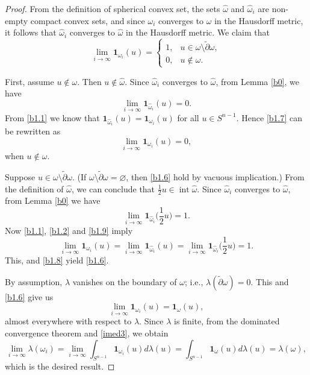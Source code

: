 \documentclass{cpamart1}     %
\theoremstyle{definition}
\theoremstyle{remark}
\newcommand{\chara}[1]{{\mathbf{1}_{#1}}}
\DeclareMathOperator{\Int}{int}
\begin{document}
\begin{proof}
From the definition of spherical convex set, the sets $\hat{\omega}$
and $\hat{\omega}_i$ are non-empty compact convex sets, and since $\omega_i$
converges to $\omega$ in the Hausdorff metric, it follows that $\hat{\omega}_i$
converges to $\hat{\omega}$ in the Hausdorff metric.
We claim that
\begin{equation}
\label{b1.6}
\lim_{i\rightarrow \infty} \chara{\omega_i}(u)=
\begin{cases}
1,& u\in \omega\setminus\tilde{\partial}\omega,\\
0,& u\notin \omega.
\end{cases}
\end{equation}

First, assume $u\notin \omega$. Then $u\notin \hat{\omega}$.
Since $\hat{\omega}_i$ converges to $\hat{\omega}$, from Lemma \ref{b0}, we have
\begin{equation}
\label{b1.7}
\lim_{i\rightarrow \infty}\chara{\hat{\omega}_i}(u)=0.
\end{equation}
From \eqref{b1.1} we know that $\chara{\hat{\omega}_i}(u)= \chara{\omega_i}(u)$
for all $u\in S^{n-1}$. Hence \eqref{b1.7} can be rewritten as
\begin{equation}
\label{b1.8}
\lim_{i\rightarrow \infty}\chara{\omega_i}(u)=0,
\end{equation}
when $u\notin \omega$.

Suppose $u\in \omega\setminus \tilde{\partial} \omega$.
(If $\omega\setminus\tilde{\partial} \omega =\varnothing$, then \eqref{b1.6}
hold by vacuous implication.)
From the definition of $\hat{\omega}$, we can conclude that $\frac{1}{2}u\in \Int \hat{\omega}$.
 Since
$\hat{\omega}_i$ converges to $\hat{\omega}$, from Lemma \ref{b0} we have
\begin{equation}
\label{b1.9}
\lim_{i\rightarrow \infty}\chara{\hat{\omega}_i}\big(\textstyle\frac{1}{2}u\big)=1.
\end{equation}
Now \eqref{b1.1}, \eqref{b1.2} and \eqref{b1.9} imply
\begin{equation*}
\lim_{i\rightarrow \infty}\chara{\omega_i}(u)
=\lim_{i\rightarrow \infty}\chara{\hat{\omega}_i}(u)
=\lim_{i\rightarrow \infty}\chara{\hat{\omega}_i}\big(\textstyle\frac{1}{2}u\big)=1.
\end{equation*}
This, and \eqref{b1.8} yield \eqref{b1.6}.

By assumption, $\lambda$ vanishes on the boundary of $\omega$; i.e.,
$\lambda(\tilde{\partial}\omega)=0$.
This and \eqref{b1.6} give us
\begin{equation}\label{imed3}
\lim_{i\rightarrow \infty}\chara{\omega_i}(u)=\chara{\omega}(u),
\end{equation}
almost everywhere with respect to $\lambda$. Since $\lambda$ is finite,
from the dominated convergence theorem and \eqref{imed3}, we obtain
\begin{equation*}
\lim_{i\rightarrow \infty}\lambda(\omega_i)
=\lim_{i\rightarrow \infty}\int_{S^{n-1}}\chara{\omega_i}(u)d\lambda(u)
=\int_{S^{n-1}}\chara{\omega}(u)d\lambda(u)=\lambda(\omega),
\end{equation*}
which is the desired result.
\end{proof}
\end{document}
